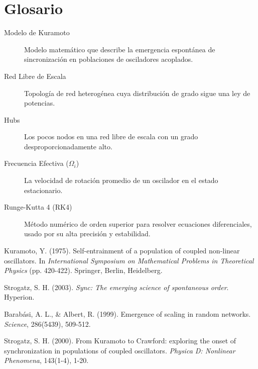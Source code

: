 \documentclass[12pt, a4paper]{article}
\begin{document}
\appendix
\section{Glosario}

\begin{description}
    \item[Modelo de Kuramoto] Modelo matemático que describe la emergencia espontánea de sincronización en poblaciones de osciladores acoplados.
    \item[Red Libre de Escala] Topología de red heterogénea cuya distribución de grado sigue una ley de potencias.
    \item[Hubs] Los pocos nodos en una red libre de escala con un grado desproporcionadamente alto.
    \item[Frecuencia Efectiva (\(\Omega_i\))] La velocidad de rotación promedio de un oscilador en el estado estacionario.
    \item[Runge-Kutta 4 (RK4)] Método numérico de orden superior para resolver ecuaciones diferenciales, usado por su alta precisión y estabilidad.
\end{description}

\begin{thebibliography}{9}
    Kuramoto, Y. (1975). Self-entrainment of a population of coupled non-linear oscillators. In \textit{International Symposium on Mathematical Problems in Theoretical Physics} (pp. 420-422). Springer, Berlin, Heidelberg.
    
    Strogatz, S. H. (2003). \textit{Sync: The emerging science of spontaneous order}. Hyperion.

    Barabási, A. L., & Albert, R. (1999). Emergence of scaling in random networks. \textit{Science}, 286(5439), 509-512.
    
    Strogatz, S. H. (2000). From Kuramoto to Crawford: exploring the onset of synchronization in populations of coupled oscillators. \textit{Physica D: Nonlinear Phenomena}, 143(1-4), 1-20.

\end{thebibliography}
\end{document}
